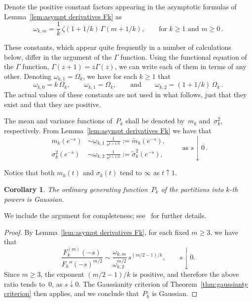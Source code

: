 \documentclass[12pt]{amsart}
\newtheorem{corollary}{Corollary}[section]
\theoremstyle{definition}
\begin{document}
Denote the positive constant factors appearing in the asymptotic formulas of Lemma~\ref{lem:asympt derivatives Fk} as
\begin{equation}\label{eq:omegakm}
\omega_{k,m} = \frac{1}{k}\,\zeta(1+1/k)\,\Gamma(m+1/k), \qquad \text{for } k\ge 1 \text{ and } m\ge 0\,.
\end{equation}

These constants, which appear quite frequently in a number of calculations below, differ in the argument of the $\Gamma$ function. Using the functional equation of
the $\Gamma$ function, $\Gamma(z+1)=z\Gamma(z)$, we can write each of them in terms of any other.
Denoting $\omega_{k,1}=\Omega_k$,  we have for each $k\ge 1$ that
\begin{equation}\label{eq:omegarelations}
\omega_{k,0} = k\,\Omega_k, \qquad \omega_{k,1} = \Omega_k, \qquad \text{and} \qquad \omega_{k,2} = (1+1/k)\,\Omega_k\,.
\end{equation}
The actual values of these constants are not used in what follows, just that they exist and that they are positive.
\smallskip

The mean and variance functions of~$P_k$ shall be denoted by~$m_k$ and~$\sigma_k^2$, respectively.
From Lemma~\ref{lem:asympt derivatives Fk} we have that
\begin{equation}\label{eq:mkasympt}
\begin{aligned}
m_k(e^{-s}) &\sim \omega_{k,1}\,\frac{1}{s^{1+1/k}} := \tilde{m}_k(e^{-s}),\\[4pt]
\sigma_k^2(e^{-s}) &\sim \omega_{k,2}\,\frac{1}{s^{2+1/k}} := \tilde{\sigma}_k^2(e^{-s}),
\end{aligned}
\qquad \text{as } s\downarrow 0\,.
\end{equation}

Notice that both $m_k(t)$ and $\sigma_k(t)$ tend to $\infty$ as $t\uparrow 1$.

\begin{corollary}\label{cor:gaussianity of Pk}
The ordinary generating function~$P_k$ of the partitions into $k$-th powers
is Gaussian.
\end{corollary}


We include the argument for completeness; see~\cite{MaciaGaussianity} for further details. \begin{proof} By
Lemma~\ref{lem:asympt derivatives Fk}, for each fixed $m\ge 3$, we have that
\[
\frac{F_k^{(m)}(-s)}{F_k''(-s)^{m/2}} \sim \frac{\omega_{k,m}}{\omega_{k,2}^{m/2}}\, s^{(m/2-1)/k}, \qquad s\downarrow 0.
\]
Since $m\ge 3$, the exponent $(m/2-1)/k$ is positive, and therefore the above ratio tends
to~$0$, as $s\downarrow 0$. The Gaussianity criterion of Theorem~\ref{thm:gaussianty criterion} then applies, and we conclude
that~$P_k$ is Gaussian.
\end{proof}
\end{document}
